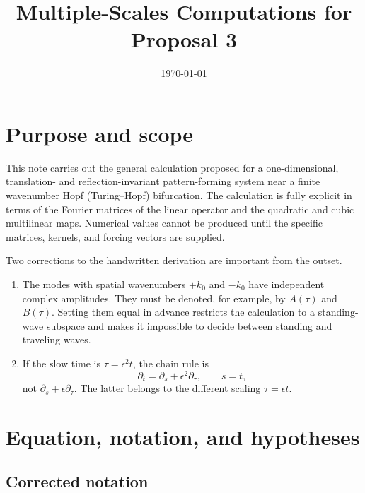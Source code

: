 \documentclass[11pt]{article}
\title{Multiple-Scales Computations for Proposal 3}
\author{}
\date{\today}
\begin{document}
\maketitle
\tableofcontents

\section{Purpose and scope}

This note carries out the general calculation proposed for a one-dimensional,
translation- and reflection-invariant pattern-forming system near a finite
wavenumber Hopf (Turing--Hopf) bifurcation.  The calculation is fully explicit
in terms of the Fourier matrices of the linear operator and the quadratic and
cubic multilinear maps.  Numerical values cannot be produced until the
specific matrices, kernels, and forcing vectors are supplied.

Two corrections to the handwritten derivation are important from the outset.

\begin{enumerate}[label=\arabic*.]
  \item The modes with spatial wavenumbers $+k_0$ and $-k_0$ have independent
  complex amplitudes.  They must be denoted, for example, by $A(\tau)$ and
  $B(\tau)$.  Setting them equal in advance restricts the calculation to a
  standing-wave subspace and makes it impossible to decide between standing
  and traveling waves.

  \item If the slow time is $\tau=\epsilon^2t$, the chain rule is
  \begin{equation}
    \partial_t=\partial_s+\epsilon^2\partial_\tau,
    \qquad s=t,
    \label{eq:chain-rule}
  \end{equation}
  not $\partial_s+\epsilon\partial_\tau$.  The latter belongs to the different
  scaling $\tau=\epsilon t$.
\end{enumerate}

\section{Equation, notation, and hypotheses}

\subsection{Corrected notation}
\end{document}
